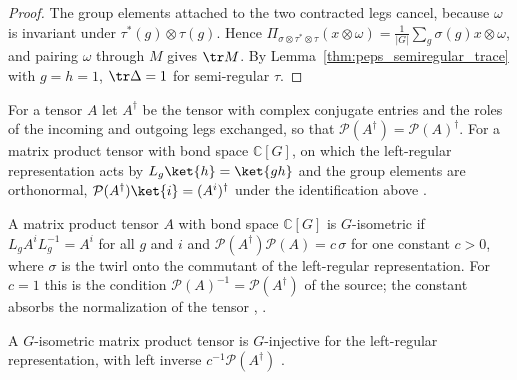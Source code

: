 \begin{proof}\leanok
    The group elements attached to the two contracted legs cancel, because
    $\omega$ is invariant under $\tau^*(g)\otimes\tau(g)$. Hence
    $\Pi_{\sigma\otimes\tau^*\otimes\tau}(x\otimes\omega)
        =\frac{1}{|G|}\sum_g\sigma(g)x\otimes\omega$, and pairing $\omega$
    through $M$ gives $\tr M$. By Lemma~\ref{thm:peps_semiregular_trace}
    with $g=h=1$, $\tr\Delta=1$ for semi-regular $\tau$.
\end{proof}

For a tensor $A$ let $A^\dagger$ be the tensor with complex conjugate entries
and the roles of the incoming and outgoing legs exchanged, so that
$\mathcal{P}(A^\dagger)=\mathcal{P}(A)^\dagger$. For a matrix product tensor
with bond space $\mathbb{C}[G]$, on which the left-regular representation acts
by $L_g\ket{h}=\ket{gh}$ and the group elements are orthonormal,
$\mathcal{P}(A^\dagger)\ket{i}=(A^i)^\dagger$ under the identification above
\cite[Section~``Isometric PEPS'']{Schuch2010PEPS}.

\begin{definition}%
    \label{def:peps_mps_g_isometric}
    \leanok
    A matrix product tensor $A$ with bond space $\mathbb{C}[G]$ is
    $G$-isometric if $L_gA^iL_g^{-1}=A^i$ for all $g$ and $i$ and
    $\mathcal{P}(A^\dagger)\mathcal{P}(A)=c\,\sigma$ for one constant $c>0$,
    where $\sigma$ is the twirl onto the commutant of the left-regular
    representation. For $c=1$ this is the condition
    $\mathcal{P}(A)^{-1}=\mathcal{P}(A^\dagger)$ of the source; the constant
    absorbs the normalization of the tensor
    \cite[Definition~6.1]{Schuch2010PEPS},
    \cite{gap:rmp_peps_quantum_double_g_isometry}.
\end{definition}

\begin{lemma}%
    \label{thm:peps_mps_g_isometric_injective}
    \leanok
    A $G$-isometric matrix product tensor is $G$-injective for the left-regular
    representation, with left inverse $c^{-1}\mathcal{P}(A^\dagger)$
    \cite[Definition~6.1]{Schuch2010PEPS}.
\end{lemma}

